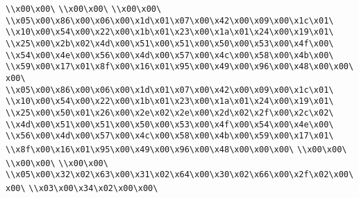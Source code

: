 \verb|\\x00\x00\|\newline
\verb|\\x00\x00\|\newline
\verb|\\x00\x00\|\newline
\verb|\\x05\x00\x86\x00\x06\x00\x1d\x01\x07\x00\x42\x00\x09\x00\x1c\x01\|\newline
\verb|\\x10\x00\x54\x00\x22\x00\x1b\x01\x23\x00\x1a\x01\x24\x00\x19\x01\|\newline
\verb|\\x25\x00\x2b\x02\x4d\x00\x51\x00\x51\x00\x50\x00\x53\x00\x4f\x00\|\newline
\verb|\\x54\x00\x4e\x00\x56\x00\x4d\x00\x57\x00\x4c\x00\x58\x00\x4b\x00\|\newline
\verb|\\x59\x00\x17\x01\x8f\x00\x16\x01\x95\x00\x49\x00\x96\x00\x48\x00\x00\x00\|\newline
\verb|\\x05\x00\x86\x00\x06\x00\x1d\x01\x07\x00\x42\x00\x09\x00\x1c\x01\|\newline
\verb|\\x10\x00\x54\x00\x22\x00\x1b\x01\x23\x00\x1a\x01\x24\x00\x19\x01\|\newline
\verb|\\x25\x00\x50\x01\x26\x00\x2e\x02\x2e\x00\x2d\x02\x2f\x00\x2c\x02\|\newline
\verb|\\x4d\x00\x51\x00\x51\x00\x50\x00\x53\x00\x4f\x00\x54\x00\x4e\x00\|\newline
\verb|\\x56\x00\x4d\x00\x57\x00\x4c\x00\x58\x00\x4b\x00\x59\x00\x17\x01\|\newline
\verb|\\x8f\x00\x16\x01\x95\x00\x49\x00\x96\x00\x48\x00\x00\x00\|\newline
\verb|\\x00\x00\|\newline
\verb|\\x00\x00\|\newline
\verb|\\x00\x00\|\newline
\verb|\\x05\x00\x32\x02\x63\x00\x31\x02\x64\x00\x30\x02\x66\x00\x2f\x02\x00\x00\|\newline
\verb|\\x03\x00\x34\x02\x00\x00\|\newline
